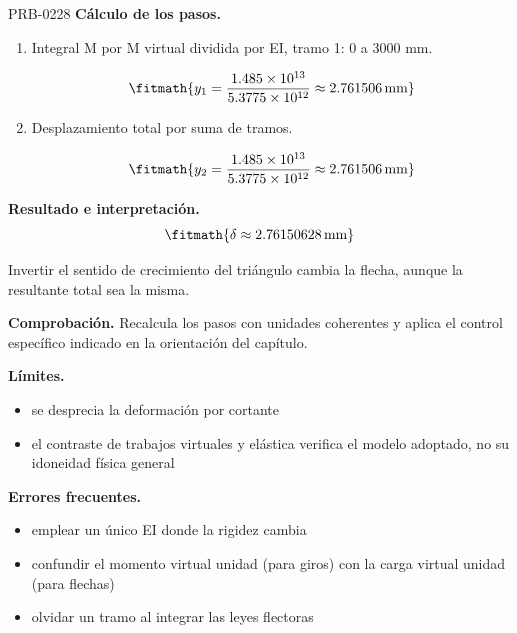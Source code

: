 \begin{studiumworked}{PRB-0228}
\textbf{Cálculo de los pasos.}

\begin{enumerate}

\item Integral M por M virtual dividida por EI, tramo 1: 0 a 3000 mm.

\[\fitmath{y_{1}=\frac{1.485\times10^{13}}{5.3775\times10^{12}}\approx 2.761506\,\mathrm{mm}}\]

\item Desplazamiento total por suma de tramos.

\[\fitmath{y_{2}=\frac{1.485\times10^{13}}{5.3775\times10^{12}}\approx 2.761506\,\mathrm{mm}}\]

\end{enumerate}

\textbf{Resultado e interpretación.}\[\fitmath{\delta \approx 2.76150628\,\mathrm{mm}}\]

Invertir el sentido de crecimiento del triángulo cambia la flecha, aunque la resultante total sea la misma.

\par\textbf{Comprobación.} Recalcula los pasos con unidades coherentes y aplica el control específico indicado en la orientación del capítulo.

\textbf{Límites.}\begin{itemize}\item se desprecia la deformación por cortante
\item el contraste de trabajos virtuales y elástica verifica el modelo adoptado, no su idoneidad física general\end{itemize}

\textbf{Errores frecuentes.}\begin{itemize}\item emplear un único EI donde la rigidez cambia
\item confundir el momento virtual unidad (para giros) con la carga virtual unidad (para flechas)
\item olvidar un tramo al integrar las leyes flectoras\end{itemize}

\end{studiumworked}

\Needspace{.3\textheight}

